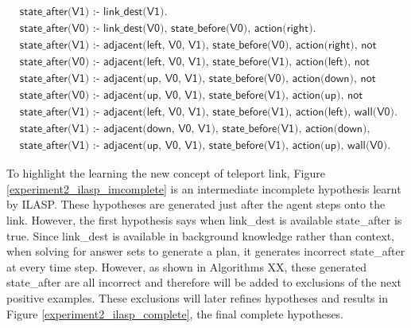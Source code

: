 \begin{equation}
\begin{split}
&\textsf{state\_after(V1) :- link\_dest(V1).}\\
&\textsf{state\_after(V0) :- link\_dest(V0), state\_before(V0), action(right).}\\
&\textsf{state\_after(V1) :- adjacent(left, V0, V1), state\_before(V0), action(right), not wall(V1).}\\
&\textsf{state\_after(V0) :- adjacent(left, V0, V1), state\_before(V1), action(left), not wall(V0).}\\
&\textsf{state\_after(V1) :- adjacent(up, V0, V1), state\_before(V0), action(down), not wall(V1).}\\
&\textsf{state\_after(V0) :- adjacent(up, V0, V1), state\_before(V1), action(up), not wall(V0).}\\
&\textsf{state\_after(V1) :- adjacent(left, V0, V1), state\_before(V1), action(left), wall(V0).}\\
&\textsf{state\_after(V1) :- adjacent(down, V0, V1), state\_before(V1), action(down), wall(V0).}\\
&\textsf{state\_after(V1) :- adjacent(up, V0, V1), state\_before(V1), action(up), wall(V0).}
\end{split}
\label{experiment2_ilasp_imcomplete}
\end{equation}

To highlight the learning the new concept of teleport link, Figure \ref{experiment2_ilasp_imcomplete} is an intermediate incomplete hypothesis learnt by ILASP.
These hypotheses are generated just after the agent steps onto the link. However, the first hypothesis says
when link\_dest is available state\_after is true. Since link\_dest is available in background knowledge rather than context,
when solving for answer sets to generate a plan, it generates incorrect state\_after at every time step.
However, as shown in Algorithms XX, these generated state\_after are all incorrect and therefore will be added to exclusions of the next positive examples.
These exclusions will later refines hypotheses and results in Figure \ref{experiment2_ilasp_complete}, the final complete hypotheses.


